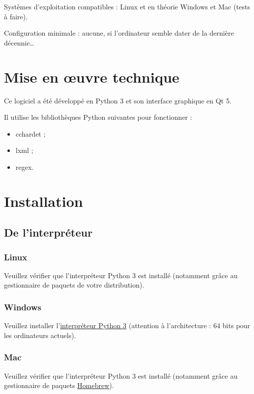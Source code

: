 \documentclass[10pt]{report}
\begin{document}
Systèmes d’exploitation compatibles : Linux et en théorie Windows et Mac (tests à faire).

Configuration minimale : aucune, si l’ordinateur semble dater de la dernière décennie…

\section{Mise en œuvre technique}

Ce logiciel a été développé en Python 3 et son interface graphique en Qt 5.

Il utilise les bibliothèques Python suivantes pour fonctionner :

\begin{itemize}
	\item cchardet ;
	\item lxml ;
	\item regex.
\end{itemize}

\section{Installation}

\subsection{De l’interpréteur}

\subsubsection{Linux}

Veuillez vérifier que l’interpréteur Python 3 est installé (notamment grâce au gestionnaire de paquets de votre distribution).

\subsubsection{Windows}

Veuillez installer l’\href{https://www.python.org/downloads/windows/}{interpréteur Python 3} (attention à l’architecture : 64 bits pour les ordinateurs actuels).

\subsubsection{Mac}

Veuillez vérifier que l’interpréteur Python 3 est installé (notamment grâce au gestionnaire de paquets \href{https://brew.sh/}{Homebrew}).
\end{document}

